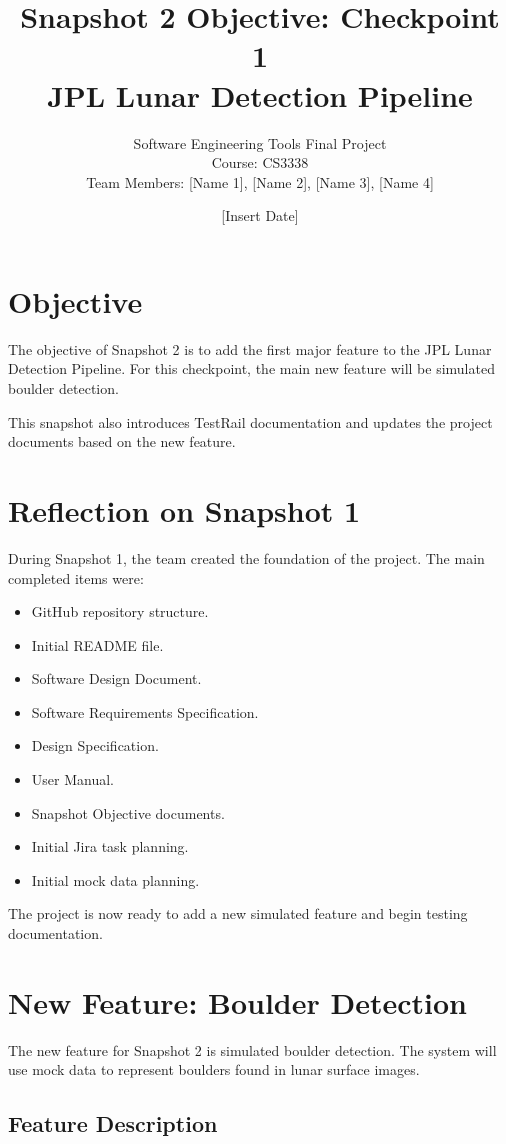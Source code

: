 \documentclass[12pt]{article}
\title{
    \textbf{Snapshot 2 Objective: Checkpoint 1} \\
    JPL Lunar Detection Pipeline
}
\author{
    Software Engineering Tools Final Project \\
    Course: CS3338 \\
    Team Members: [Name 1], [Name 2], [Name 3], [Name 4]
}
\date{[Insert Date]}
\begin{document}
\maketitle
\newpage

\section{Objective}

The objective of Snapshot 2 is to add the first major feature to the JPL Lunar Detection Pipeline. For this checkpoint, the main new feature will be simulated boulder detection.

This snapshot also introduces TestRail documentation and updates the project documents based on the new feature.

\section{Reflection on Snapshot 1}

During Snapshot 1, the team created the foundation of the project. The main completed items were:

\begin{itemize}
    \item GitHub repository structure.
    \item Initial README file.
    \item Software Design Document.
    \item Software Requirements Specification.
    \item Design Specification.
    \item User Manual.
    \item Snapshot Objective documents.
    \item Initial Jira task planning.
    \item Initial mock data planning.
\end{itemize}

The project is now ready to add a new simulated feature and begin testing documentation.

\section{New Feature: Boulder Detection}

The new feature for Snapshot 2 is simulated boulder detection. The system will use mock data to represent boulders found in lunar surface images.

\subsection{Feature Description}
\end{document}
